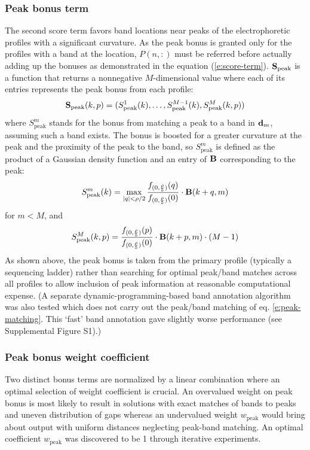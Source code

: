 \subsubsection{Peak bonus term}
The second score term favors band locations near peaks of the electrophoretic profiles with a significant curvature. As the peak bonus is granted only for the profiles with a band at the location, $P(n,:)$ must be referred before actually adding up the bonuses as demonstrated in the equation (\ref{e:score-term}).
$\bold{S}_{\textrm{peak}}$ is a function that returns a nonnegative $M$-dimensional value where each of its entries represents the peak bonus from each profile:
%
\begin{equation}
\bold{S}_{\textrm{peak}}(k,p) = (S^1_{\textrm{peak}}(k), \ldots, S^{M-1}_{\textrm{peak}}(k), S^M_{\textrm{peak}}(k,p))
\end{equation}
%
where $S^m_{\textrm{peak}}$ stands for the bonus from matching a peak to a band in ${\mathbf{d}}_m$, assuming such a band exists. The bonus is boosted for a greater curvature at the peak and the proximity of the peak to the band, so $S^m_{\textrm{peak}}$ is defined as the product of a Gaussian density function and an entry of ${\mathbf{B}}$ corresponding to the peak:
%
\begin{equation}
S^m_{\textrm{peak}}(k) = \max_{\substack{|q| < \rho/2}} {{f_{(0, {\rho \over 5})}(q)} \over {f_{(0, {\rho \over 5})}(0)}} \cdot {\mathbf{B}}(k+q, m)
\end{equation}
%
for $m < M$, and
%
\begin{equation}\label{e:peak-matching}
S^M_{\textrm{peak}}(k,p) = {{f_{(0, {\rho \over 5})}(p)} \over {f_{(0, {\rho \over 5})}(0)}} \cdot {\mathbf{B}}(k+p, m) \cdot (M-1)
\end{equation}
%
As shown above, the peak bonus is taken from the primary profile (typically a sequencing ladder) rather than searching for optimal peak/band matches across all profiles to allow inclusion of peak information at reasonable computational expense. (A separate dynamic-programming-based band annotation algorithm was also tested which does not carry out the peak/band matching of eq. \ref{e:peak-matching}. This `fast' band annotation gave slightly worse performance (see Supplemental Figure S1).)

\subsubsection{Peak bonus weight coefficient}
Two distinct bonus terms are normalized by a linear combination where an optimal selection of weight coefficient is crucial. An overvalued weight on peak bonus is most likely to result in solutions with exact matches of bands to peaks and uneven distribution of gaps whereas an undervalued weight $w_{\textrm{peak}}$ would bring about output with uniform distances neglecting peak-band matching. An optimal coefficient $w_{\textrm{peak}}$ was discovered to be 1 through iterative experiments.


